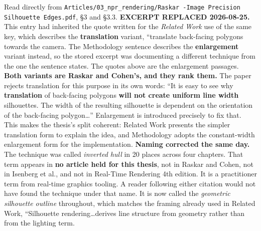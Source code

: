 \documentclass[11pt, a4paper]{article}
\begin{document}
\begin{Form}
  {Read directly from \texttt{\footnotesize Articles/03\_npr\_rendering/Raskar -Image Precision Silhouette Edges.pdf}, \S3 and \S3.3. \textbf{EXCERPT REPLACED 2026-08-25.} This entry had inherited the quote written for the \emph{Related Work} use of the same key, which describes the \textbf{translation} variant, ``translate back-facing polygons towards the camera. The Methodology sentence describes the \textbf{enlargement} variant instead, so the stored excerpt was documenting a different technique from the one the sentence states. The quotes above are the enlargement passages. \textbf{Both variants are Raskar and Cohen's, and they rank them.} The paper rejects translation for this purpose in its own words: ``It is easy to see why \textbf{translation} of back-facing polygons \textbf{will not create uniform line width} silhouettes. The width of the resulting silhouette is dependent on the orientation of the back-facing polygon\ldots'' Enlargement is introduced precisely to fix that. This makes the thesis's split coherent: Related Work presents the simpler translation form to explain the idea, and Methodology adopts the constant-width enlargement form for the implementation. \textbf{Naming corrected the same day.} The technique was called \emph{inverted hull} in 20 places across four chapters. That term appears in \textbf{no article held for this thesis}, not in Raskar and Cohen, not in Isenberg et al., and not in Real-Time Rendering 4th edition. It is a practitioner term from real-time graphics tooling. A reader following either citation would not have found the technique under that name. It is now called the \emph{geometric silhouette outline} throughout, which matches the framing already used in Related Work, ``Silhouette rendering\ldots derives line structure from geometry rather than from the lighting term.}


\end{Form}
\end{document}
